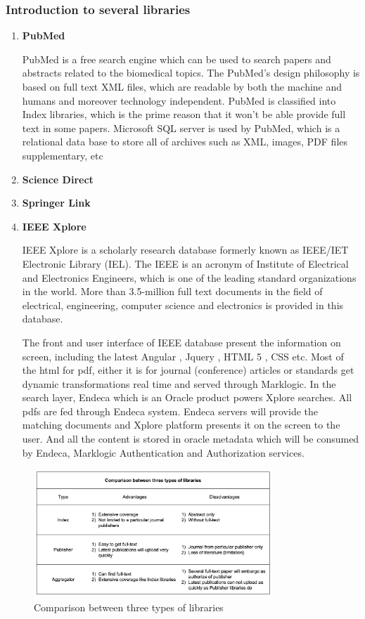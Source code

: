 \subsubsection{Introduction to several libraries }
\begin{enumerate}
	\item\textbf{PubMed}
		
	 PubMed is a free search engine which can be used to search papers and abstracts related to the biomedical topics. The PubMed’s design philosophy is based on full text XML files, which are readable by both the machine and humans and moreover technology independent. PubMed is classified into Index libraries, which is the prime reason that it won’t be able provide full text in some papers. Microsoft SQL server is used by PubMed, which is a relational data base to store all of archives such as XML, images, PDF files supplementary, etc
	
	\item\textbf{Science Direct}
	\item\textbf{Springer Link}
	\item\textbf{IEEE Xplore}
	
	IEEE Xplore is a scholarly research database formerly known as IEEE/IET Electronic Library (IEL). The IEEE is an acronym of Institute of Electrical and Electronics Engineers, which is one of the leading standard organizations in the world. More than 3.5-million full text documents in the field of electrical, engineering, computer science and electronics is provided in this database. 
	
	The front and user interface of IEEE database present the information on screen, including the latest Angular , Jquery , HTML 5 , CSS etc. Most of the html for pdf, either it is for journal (conference) articles or standards get dynamic transformations real time and served through Marklogic. In the search layer, Endeca which is an Oracle product powers Xplore searches. All pdfs are fed through Endeca system. Endeca servers will provide the matching documents and Xplore platform presents it on the screen to the user. And all the content is stored in oracle metadata which will be consumed by Endeca, Marklogic Authentication and Authorization services.
	
\end{enumerate}

\begin{figure}[htb]
	\begin{center}
		\includegraphics[width=0.8\textwidth]{WolverineChart3}
	\end{center}
	\caption{Comparison between three types of libraries}
\end{figure}
\newpage
